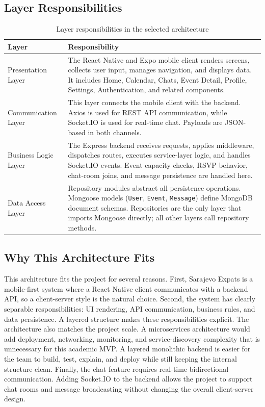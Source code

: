 \documentclass[12pt,a4paper]{article}
\begin{document}
\subsection{Layer Responsibilities}
\begin{longtable}{@{}p{}p{}@{}}
\caption{Layer responsibilities in the selected architecture}\\
\toprule
\textbf{Layer} & \textbf{Responsibility} \\
\midrule
\endhead
Presentation Layer &
The React Native and Expo mobile client renders screens, collects user input, manages
navigation, and displays data. It includes Home, Calendar, Chats, Event Detail, Profile,
Settings, Authentication, and related components. \\
\addlinespace
Communication Layer &
This layer connects the mobile client with the backend. Axios is used for REST API
communication, while Socket.IO is used for real-time chat. Payloads are JSON-based in
both channels. \\
\addlinespace
Business Logic Layer &
The Express backend receives requests, applies middleware, dispatches routes, executes
service-layer logic, and handles Socket.IO events. Event capacity checks, RSVP behavior,
chat-room joins, and message persistence are handled here. \\
\addlinespace
Data Access Layer &
Repository modules abstract all persistence operations. Mongoose models (\texttt{User},
\texttt{Event}, \texttt{Message}) define MongoDB document schemas. Repositories are
the only layer that imports Mongoose directly; all other layers call repository methods. \\
\bottomrule
\end{longtable}
\subsection{Why This Architecture Fits}
This architecture fits the project for several reasons. First, Sarajevo Expats is a
mobile-first system where a React Native client communicates with a backend API, so a
client-server style is the natural choice. Second, the system has clearly separable
responsibilities: UI rendering, API communication, business rules, and data persistence.
A layered structure makes these responsibilities explicit.
The architecture also matches the project scale. A microservices architecture would add
deployment, networking, monitoring, and service-discovery complexity that is unnecessary
for this academic MVP. A layered monolithic backend is easier for the team to build,
test, explain, and deploy while still keeping the internal structure clean.
Finally, the chat feature requires real-time bidirectional communication. Adding
Socket.IO to the backend allows the project to support chat rooms and message
broadcasting without changing the overall client-server design.
\end{document}
